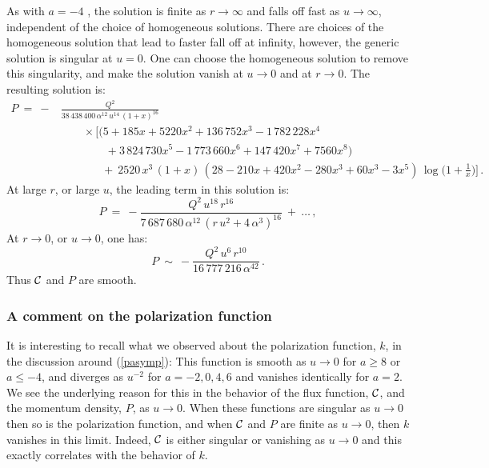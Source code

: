 \documentclass[11pt]{article}
\def\cC{{\cal C}}
\numberwithin{equation}{section}
\begin{document}
As with $a=-4$ , the solution  is finite as $r \to \infty$ and falls off fast as $u \to \infty$, independent of the choice of homogeneous solutions.  There are choices of the homogeneous solution that lead to faster fall off at infinity, however, the generic solution is singular at $u=0$.  One can choose  the homogeneous solution to remove this singularity, and make the solution vanish at  $u \to 0$ and at $r \to 0$.  The resulting solution is:
%
\begin{equation}
\begin{aligned}
P  ~=~- & \frac{Q^2}{38\,438\,400\, \alpha^{12}\, u^{14}\,(1+x)^{16} }  \\
& \qquad\times \bigg[ \big(5 +185 x +5220 x^2 + 136\,752 x^3 - 1\,782\, 228 x^4 \\
&\qquad \qquad+  3\, 824 \, 730 x^5 - 1\, 773 \, 660 x^6 +147\, 420 x^7+ 7560 x^8 \big) \\
& \qquad \quad\ \ ~+~ 2520 \, x^3\,(1+x) \,(28 -210x+ 420  x^2 -280 x^3+ 60 x^3 -3 x^5)\, \log \bigg(1+\frac{1}{x}\bigg) \bigg] \,.
\end{aligned}
\label{Ppart-6}
\end{equation}
% 
 At  large $r$, or large $u$, the leading term in this solution is:
%
\begin{equation}
P  ~=~ - \frac{Q^2\, u^{18}\, r^{16} }{7\,687\,680 \,\alpha^{12} \, (r \, u^2 + 4 \, \alpha^3)^{16} } ~+~ \dots \,,
\label{Pasymp-6}
\end{equation}
%
 At   $r \to 0$, or  $u \to 0$, one has:
%
\begin{equation}
P  ~\sim~ - \frac{Q^2\, u^{6}\, r^{10} }{16\,777\,216 \,\alpha^{42}}\,.
\label{Psrc-6}
\end{equation}
%
Thus $\cC$ and $P$ are  smooth. 


\subsubsection{A comment on the polarization function}
\label{ss:polfn} 

It is interesting to recall what we observed about the polarization function, $k$, in the discussion around (\ref{pasymp}):  This function is smooth 
as $u \to 0$ for $a  \ge 8$ or  $a \le -4$, and diverges as $u^{-2}$ for $a=-2,0,4,6$ and vanishes identically for $a=2$.    
We see the underlying reason for this in the behavior of the flux function, $\cC$, and the momentum density, $P$, as $u \to 0$.  When these functions are singular as $u \to 0$ then so is the polarization function, and when $\cC$ and $P$ are finite as $u \to 0$, then $k$ vanishes in this limit.  Indeed, $\cC$ is either singular or vanishing as $u \to 0$ and this exactly correlates with the behavior of $k$.    
\end{document}
